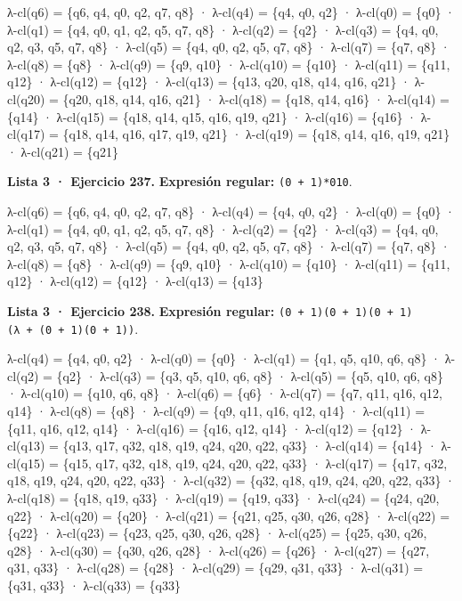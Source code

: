λ-cl(q6) = \{q6, q4, q0, q2, q7, q8\} · λ-cl(q4) = \{q4, q0, q2\} · λ-cl(q0) = \{q0\} · λ-cl(q1) = \{q4, q0, q1, q2, q5, q7, q8\} · λ-cl(q2) = \{q2\} · λ-cl(q3) = \{q4, q0, q2, q3, q5, q7, q8\} · λ-cl(q5) = \{q4, q0, q2, q5, q7, q8\} · λ-cl(q7) = \{q7, q8\} · λ-cl(q8) = \{q8\} · λ-cl(q9) = \{q9, q10\} · λ-cl(q10) = \{q10\} · λ-cl(q11) = \{q11, q12\} · λ-cl(q12) = \{q12\} · λ-cl(q13) = \{q13, q20, q18, q14, q16, q21\} · λ-cl(q20) = \{q20, q18, q14, q16, q21\} · λ-cl(q18) = \{q18, q14, q16\} · λ-cl(q14) = \{q14\} · λ-cl(q15) = \{q18, q14, q15, q16, q19, q21\} · λ-cl(q16) = \{q16\} · λ-cl(q17) = \{q18, q14, q16, q17, q19, q21\} · λ-cl(q19) = \{q18, q14, q16, q19, q21\} · λ-cl(q21) = \{q21\}

\textbf{Lista 3 · Ejercicio 237.} \textbf{Expresión regular:} \texttt{(0\ +\ 1)*010}.

λ-cl(q6) = \{q6, q4, q0, q2, q7, q8\} · λ-cl(q4) = \{q4, q0, q2\} · λ-cl(q0) = \{q0\} · λ-cl(q1) = \{q4, q0, q1, q2, q5, q7, q8\} · λ-cl(q2) = \{q2\} · λ-cl(q3) = \{q4, q0, q2, q3, q5, q7, q8\} · λ-cl(q5) = \{q4, q0, q2, q5, q7, q8\} · λ-cl(q7) = \{q7, q8\} · λ-cl(q8) = \{q8\} · λ-cl(q9) = \{q9, q10\} · λ-cl(q10) = \{q10\} · λ-cl(q11) = \{q11, q12\} · λ-cl(q12) = \{q12\} · λ-cl(q13) = \{q13\}

\textbf{Lista 3 · Ejercicio 238.} \textbf{Expresión regular:} \texttt{(0\ +\ 1)(0\ +\ 1)(0\ +\ 1)(λ\ +\ (0\ +\ 1)(0\ +\ 1))}.

λ-cl(q4) = \{q4, q0, q2\} · λ-cl(q0) = \{q0\} · λ-cl(q1) = \{q1, q5, q10, q6, q8\} · λ-cl(q2) = \{q2\} · λ-cl(q3) = \{q3, q5, q10, q6, q8\} · λ-cl(q5) = \{q5, q10, q6, q8\} · λ-cl(q10) = \{q10, q6, q8\} · λ-cl(q6) = \{q6\} · λ-cl(q7) = \{q7, q11, q16, q12, q14\} · λ-cl(q8) = \{q8\} · λ-cl(q9) = \{q9, q11, q16, q12, q14\} · λ-cl(q11) = \{q11, q16, q12, q14\} · λ-cl(q16) = \{q16, q12, q14\} · λ-cl(q12) = \{q12\} · λ-cl(q13) = \{q13, q17, q32, q18, q19, q24, q20, q22, q33\} · λ-cl(q14) = \{q14\} · λ-cl(q15) = \{q15, q17, q32, q18, q19, q24, q20, q22, q33\} · λ-cl(q17) = \{q17, q32, q18, q19, q24, q20, q22, q33\} · λ-cl(q32) = \{q32, q18, q19, q24, q20, q22, q33\} · λ-cl(q18) = \{q18, q19, q33\} · λ-cl(q19) = \{q19, q33\} · λ-cl(q24) = \{q24, q20, q22\} · λ-cl(q20) = \{q20\} · λ-cl(q21) = \{q21, q25, q30, q26, q28\} · λ-cl(q22) = \{q22\} · λ-cl(q23) = \{q23, q25, q30, q26, q28\} · λ-cl(q25) = \{q25, q30, q26, q28\} · λ-cl(q30) = \{q30, q26, q28\} · λ-cl(q26) = \{q26\} · λ-cl(q27) = \{q27, q31, q33\} · λ-cl(q28) = \{q28\} · λ-cl(q29) = \{q29, q31, q33\} · λ-cl(q31) = \{q31, q33\} · λ-cl(q33) = \{q33\}

